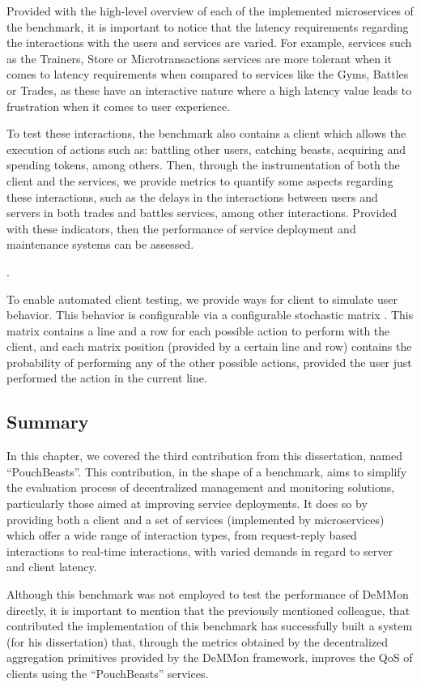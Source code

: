 Provided with the high-level overview of each of the implemented microservices of the benchmark, it is important to notice that the latency requirements regarding the interactions with the users and services are varied. For example, services such as the Trainers, Store or Microtransactions services are more tolerant when it comes to latency requirements when compared to services like the Gyms, Battles or Trades, as these have an interactive nature where a high latency value leads to frustration when it comes to user experience.

To test these interactions, the benchmark also contains a client which allows the execution of actions such as: battling other users, catching beasts, acquiring and spending tokens, among others. Then, through the instrumentation of both the client and the services, we provide metrics to quantify some aspects regarding these interactions, such as the delays in the interactions between users and servers in both trades and battles services, among other interactions. Provided with these indicators, then the performance of service deployment and maintenance systems can be assessed.

.

To enable automated client testing, we provide ways for client to simulate user behavior. This behavior is configurable via a configurable stochastic matrix . This matrix contains a line and a row for each possible action to perform with the client, and each matrix position (provided by a certain line and row) contains the probability of performing any of the other possible actions, provided the user just performed the action in the current line. 


\subsection{Summary}

In this chapter, we covered the third contribution from this dissertation, named ``PouchBeasts''. This contribution, in the shape of a benchmark, aims to simplify the evaluation process of decentralized management and monitoring solutions, particularly those aimed at improving service deployments. It does so by providing both a client and a set of services (implemented by microservices) which offer a wide range of interaction types, from request-reply based interactions to real-time interactions, with varied demands in regard to server and client latency.

Although this benchmark was not employed to test the performance of DeMMon directly, it is important to mention that the previously mentioned colleague, that contributed the implementation of this benchmark has successfully built a system (for his dissertation) that, through the metrics obtained by the decentralized aggregation primitives provided by the DeMMon framework, improves the QoS of clients using the ``PouchBeasts'' services.